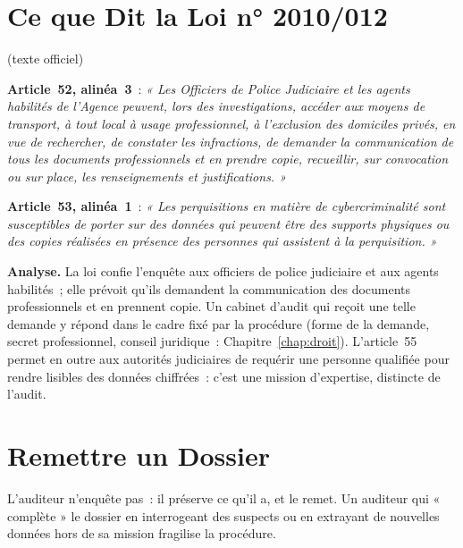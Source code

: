 \section{Ce que Dit la Loi n° 2010/012}
\label{sec:c29-loi}

\begin{boxjuris}
\textbf{} (texte officiel)

\medskip
\textbf{Article~52, alinéa~3}~: \textit{« Les Officiers de Police Judiciaire
et les agents habilités de l'Agence peuvent, lors des investigations,
accéder aux moyens de transport, à tout local à usage professionnel, à
l'exclusion des domiciles privés, en vue de rechercher, de constater les
infractions, de demander la communication de tous les documents
professionnels et en prendre copie, recueillir, sur convocation ou sur
place, les renseignements et justifications. »}

\medskip
\textbf{Article~53, alinéa~1}~: \textit{« Les perquisitions en matière de
cybercriminalité sont susceptibles de porter sur des données qui peuvent
être des supports physiques ou des copies réalisées en présence des
personnes qui assistent à la perquisition. »}

\medskip
\textbf{Analyse.} La loi confie l'enquête aux officiers de police
judiciaire et aux agents habilités~; elle prévoit qu'ils demandent la
communication des documents professionnels et en prennent copie. Un
cabinet d'audit qui reçoit une telle demande y répond dans le cadre fixé
par la procédure (forme de la demande, secret professionnel, conseil
juridique~: Chapitre~\ref{chap:droit}). L'article~55 permet en outre aux
autorités judiciaires de requérir une personne qualifiée pour rendre
lisibles des données chiffrées~: c'est une mission d'expertise, distincte
de l'audit.
\end{boxjuris}

\section{Remettre un Dossier}
\label{sec:c29-remettre}

L'auditeur n'enquête pas~: il préserve ce qu'il a, et le remet. Un
auditeur qui « complète » le dossier en interrogeant des suspects ou en
extrayant de nouvelles données hors de sa mission fragilise la procédure.

